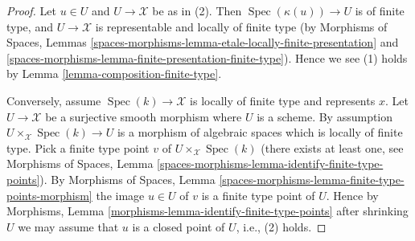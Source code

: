 \documentclass[10pt,a4paper]{amsart}
\theoremstyle{plain}
\theoremstyle{definition}
\theoremstyle{remark}
\numberwithin{equation}{subsection}
\def\Spec{\mathop{\mathrm{Spec}}}
\begin{document}
\begin{proof}
Let $u \in U$ and $U \to \mathcal{X}$ be as in (2). Then
$\Spec(\kappa(u)) \to U$ is of finite type, and $U \to \mathcal{X}$ is
representable and locally of finite type (by
Morphisms of Spaces,
Lemmas \ref{spaces-morphisms-lemma-etale-locally-finite-presentation} and
\ref{spaces-morphisms-lemma-finite-presentation-finite-type}).
Hence we see (1) holds by
Lemma \ref{lemma-composition-finite-type}.

\medskip\noindent
Conversely, assume $\Spec(k) \to \mathcal{X}$ is locally of finite type
and represents $x$. Let $U \to \mathcal{X}$ be a surjective smooth morphism
where $U$ is a scheme. By assumption
$U \times_\mathcal{X} \Spec(k) \to U$ is a morphism of algebraic
spaces which is locally of finite type. Pick a finite type point $v$ of
$U \times_\mathcal{X} \Spec(k)$ (there exists at least one, see
Morphisms of Spaces,
Lemma \ref{spaces-morphisms-lemma-identify-finite-type-points}).
By
Morphisms of Spaces,
Lemma \ref{spaces-morphisms-lemma-finite-type-points-morphism}
the image $u \in U$ of $v$ is a finite type point of $U$.
Hence by
Morphisms, Lemma \ref{morphisms-lemma-identify-finite-type-points}
after shrinking $U$ we may assume that $u$ is a closed point of $U$, i.e.,
(2) holds.
\end{proof}
\end{document}

